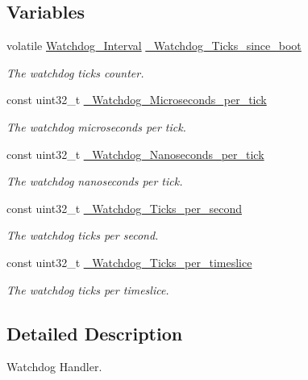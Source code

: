 \subsection*{Variables}
\begin{DoxyCompactItemize}
\item 
volatile \mbox{\hyperlink{group__RTEMSScoreWatchdog_gaa1834fd7531ca9bb5c4ca6fd990388d5}{Watchdog\+\_\+\+Interval}} \mbox{\hyperlink{group__RTEMSScoreWatchdog_ga052d69f775d0a41629e2f561025123cb}{\+\_\+\+Watchdog\+\_\+\+Ticks\+\_\+since\+\_\+boot}}
\begin{DoxyCompactList}\small\item\em The watchdog ticks counter. \end{DoxyCompactList}\item 
const uint32\+\_\+t \mbox{\hyperlink{group__RTEMSScoreWatchdog_ga09eaca36a90c004639781690cea24f3c}{\+\_\+\+Watchdog\+\_\+\+Microseconds\+\_\+per\+\_\+tick}}
\begin{DoxyCompactList}\small\item\em The watchdog microseconds per tick. \end{DoxyCompactList}\item 
const uint32\+\_\+t \mbox{\hyperlink{group__RTEMSScoreWatchdog_ga4a7476341c14936f241f8747fa33c8c9}{\+\_\+\+Watchdog\+\_\+\+Nanoseconds\+\_\+per\+\_\+tick}}
\begin{DoxyCompactList}\small\item\em The watchdog nanoseconds per tick. \end{DoxyCompactList}\item 
const uint32\+\_\+t \mbox{\hyperlink{group__RTEMSScoreWatchdog_ga637504d63c75c4648a19dd000b8326b8}{\+\_\+\+Watchdog\+\_\+\+Ticks\+\_\+per\+\_\+second}}
\begin{DoxyCompactList}\small\item\em The watchdog ticks per second. \end{DoxyCompactList}\item 
const uint32\+\_\+t \mbox{\hyperlink{group__RTEMSScoreWatchdog_gab73f9a1a0c163bf4c5625597a237e9d2}{\+\_\+\+Watchdog\+\_\+\+Ticks\+\_\+per\+\_\+timeslice}}
\begin{DoxyCompactList}\small\item\em The watchdog ticks per timeslice. \end{DoxyCompactList}\end{DoxyCompactItemize}


\subsection{Detailed Description}
Watchdog Handler. 

